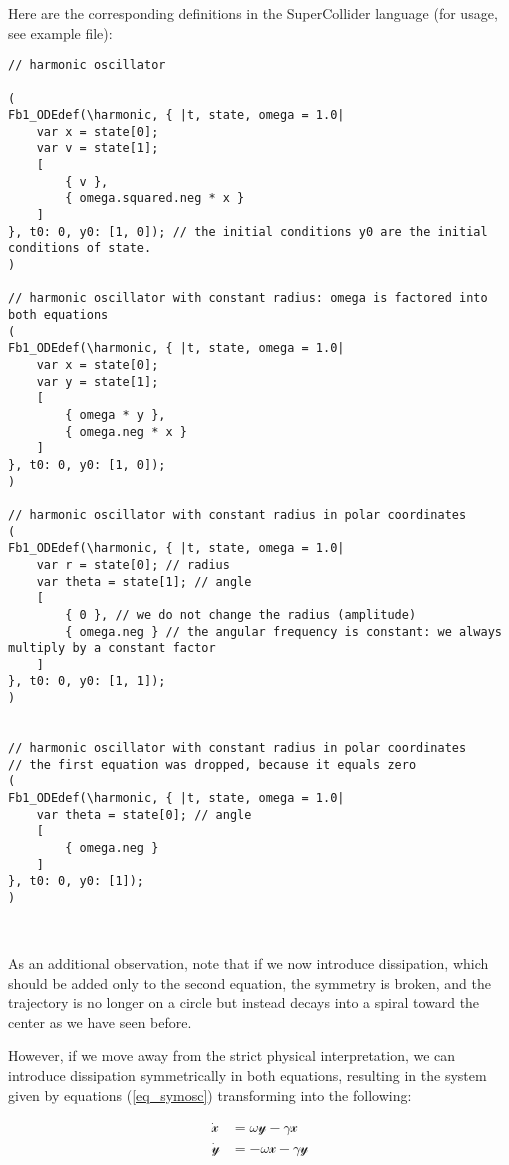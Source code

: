 \documentclass{article}
\begin{document}
Here are the corresponding definitions in the SuperCollider language (for usage, see example file):

\begin{lstlisting}[caption=The symmetric oscillator and the oscillation on the circle.]
// harmonic oscillator

(
Fb1_ODEdef(\harmonic, { |t, state, omega = 1.0|
	var x = state[0];
	var v = state[1];
	[
		{ v },
		{ omega.squared.neg * x }
	]
}, t0: 0, y0: [1, 0]); // the initial conditions y0 are the initial conditions of state.
)

// harmonic oscillator with constant radius: omega is factored into both equations
(
Fb1_ODEdef(\harmonic, { |t, state, omega = 1.0|
	var x = state[0];
	var y = state[1];
	[
		{ omega * y },
		{ omega.neg * x }
	]
}, t0: 0, y0: [1, 0]);
)

// harmonic oscillator with constant radius in polar coordinates
(
Fb1_ODEdef(\harmonic, { |t, state, omega = 1.0|
	var r = state[0]; // radius
	var theta = state[1]; // angle
	[
		{ 0 }, // we do not change the radius (amplitude)
		{ omega.neg } // the angular frequency is constant: we always multiply by a constant factor
	]
}, t0: 0, y0: [1, 1]);
)


// harmonic oscillator with constant radius in polar coordinates
// the first equation was dropped, because it equals zero
(
Fb1_ODEdef(\harmonic, { |t, state, omega = 1.0|
	var theta = state[0]; // angle
	[
		{ omega.neg }
	]
}, t0: 0, y0: [1]);
)



\end{lstlisting}




As an additional observation, note that if we now introduce dissipation, which should be added only to the second equation, the symmetry is broken, and the trajectory is no longer on a circle but instead decays into a spiral toward the center as we have seen before.

However, if we move away from the strict physical interpretation, we can introduce dissipation symmetrically in both equations, resulting in the system given by equations (\ref{eq_symosc}) transforming into the following:

\begin{subequations} \label{eq_symosc_diss}
\begin{align}
    \dot{\mathscr{x}} & = \omega\mathscr{y} - \gamma\mathscr{x} \\
    \dot{\mathscr{y}} & = -\omega\mathscr{x} - \gamma\mathscr{y}
\end{align}
\end{subequations}
\end{document}
